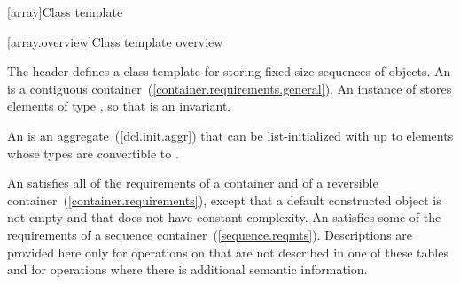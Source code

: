 [array]{Class template }
%

[array.overview]{Class template  overview}

\pnum
{}%
The header  defines a class template for storing fixed-size
sequences of objects.
An  is a contiguous container~(\ref{container.requirements.general}).
An instance of  stores  elements of type ,
so that  is an invariant.

\pnum
{}%
%
An  is an aggregate~(\ref{dcl.init.aggr}) that can be
list-initialized with up
to  elements whose types are convertible to .

\pnum
{}%
An  satisfies all of the requirements of a container and
of a reversible container~(\ref{container.requirements}), except that a default
constructed  object is not empty and that  does not have constant
complexity. An  satisfies some of the requirements of a sequence
container~(\ref{sequence.reqmts}).
Descriptions are provided here
only for operations on  that are not described in
one of these tables and
for operations where there is additional semantic information.

